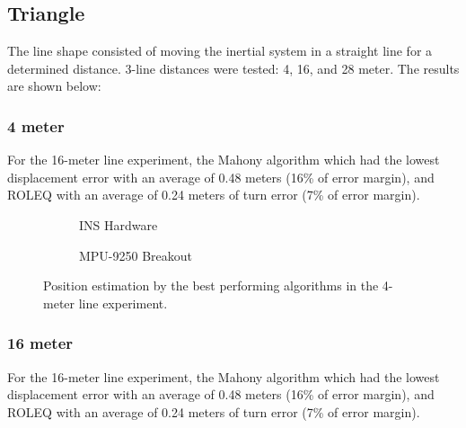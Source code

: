 \subsection{Triangle}

The line shape consisted of moving the inertial system in a straight line for a determined distance. 3-line distances were tested: 4, 16, and 28 meter. The results are shown below:

\subsubsection{4 meter}

For the 16-meter line experiment, the Mahony algorithm which had the lowest displacement error with an average of 0.48 meters (16\% of error margin), and ROLEQ with an average of 0.24 meters of turn error (7\% of error margin).

\begin{figure}[!h]
    \centering
    
\end{figure}

\begin{figure}[!h]
    \centering
    \begin{subfigure}{0.49\textwidth}
        \centering
        \resizebox{1\linewidth}{!}{}
        \caption{INS Hardware}
        \label{fig:triangle4_2D}
    \end{subfigure}
    \begin{subfigure}{0.49\textwidth}
        \centering
        \resizebox{1\linewidth}{!}{}
        \caption{MPU-9250 Breakout}
        \label{fig:triangle4_3D}
    \end{subfigure}
    \caption{Position estimation by the best performing algorithms in the 4-meter line experiment.}
    \label{fig:triangle4}
\end{figure}

\subsubsection{16 meter}

For the 16-meter line experiment, the Mahony algorithm which had the lowest displacement error with an average of 0.48 meters (16\% of error margin), and ROLEQ with an average of 0.24 meters of turn error (7\% of error margin).

\begin{figure}[!h]
    \centering
    
\end{figure}

